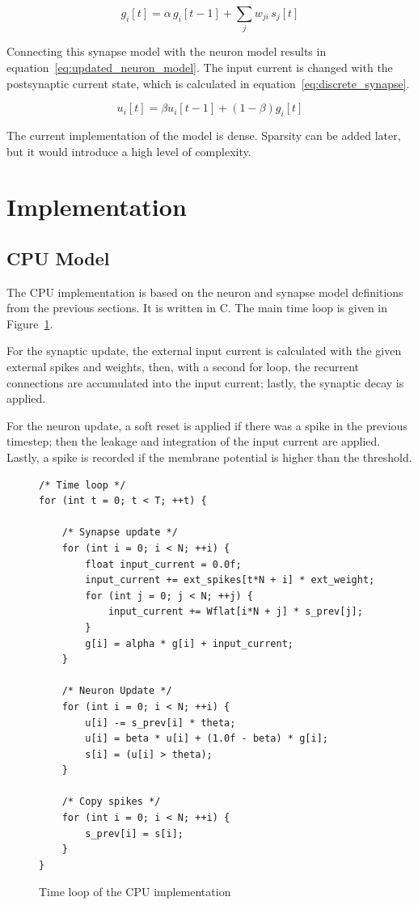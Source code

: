 \documentclass[conference]{IEEEtran}
\begin{document}
\begin{equation}
g_i[t] = \alpha\, g_i[t-1] + \sum_j w_{ji}\, s_j[t]
\label{eq:discrete_synapse}
\end{equation}

Connecting this synapse model with the neuron model results in equation~\ref{eq:updated_neuron_model}. The input current is changed with the postsynaptic current state, which is calculated in equation~\ref{eq:discrete_synapse}.

\begin{equation}
u_i[t] = \beta u_i[t-1] + (1 - \beta) g_i[t]
\label{eq:updated_neuron_model}
\end{equation}

The current implementation of the model is dense. Sparsity can be added later, but it would introduce a high level of complexity.

\section{Implementation}

\subsection{CPU Model}

The CPU implementation is based on the neuron and synapse model definitions from the previous sections. It is written in C. The main time loop is given in Figure~\ref{fig:C_impl}.

For the synaptic update, the external input current is calculated with the given external spikes and weights, then, with a second for loop, the recurrent connections are accumulated into the input current; lastly, the synaptic decay is applied.

For the neuron update, a soft reset is applied if there was a spike in the previous timestep; then the leakage and integration of the input current are applied. Lastly, a spike is recorded if the membrane potential is higher than the threshold.

\begin{figure}[htbp]
\centering
\begin{lstlisting}
/* Time loop */
for (int t = 0; t < T; ++t) {

    /* Synapse update */
    for (int i = 0; i < N; ++i) {
        float input_current = 0.0f;
        input_current += ext_spikes[t*N + i] * ext_weight;
        for (int j = 0; j < N; ++j) {
            input_current += Wflat[i*N + j] * s_prev[j];
        }
        g[i] = alpha * g[i] + input_current;
    }

    /* Neuron Update */
    for (int i = 0; i < N; ++i) {
        u[i] -= s_prev[i] * theta;
        u[i] = beta * u[i] + (1.0f - beta) * g[i];
        s[i] = (u[i] > theta);
    }

    /* Copy spikes */
    for (int i = 0; i < N; ++i) {
        s_prev[i] = s[i];
    }
}
\end{lstlisting}
\caption{Time loop of the CPU implementation}
\label{fig:C_impl}
\end{figure}
\end{document}
